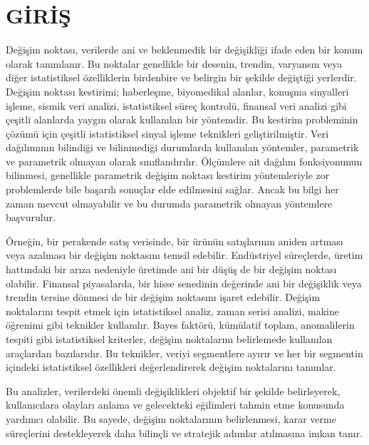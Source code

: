 \documentclass[12pt,twoside]{deuthesis}
\begin{document}
\mainmatter %
\pagestyle{fancyplain} %

\chapter*{GİRİŞ}\label{giriux15f}

Değişim noktası, verilerde ani ve beklenmedik bir değişikliği ifade eden bir konum olarak tanımlanır. Bu noktalar genellikle bir desenin, trendin, varyansın veya diğer istatistiksel özelliklerin birdenbire ve belirgin bir şekilde değiştiği yerlerdir. Değişim noktası kestirimi; haberleşme, biyomedikal alanlar, konuşma sinyalleri işleme, sismik veri analizi, istatistiksel süreç kontrolü, finansal veri analizi gibi çeşitli alanlarda yaygın olarak kullanılan bir yöntemdir. Bu kestirim probleminin çözümü için çeşitli istatistiksel sinyal işleme teknikleri geliştirilmiştir. Veri dağılımının bilindiği ve bilinmediği durumlarda kullanılan yöntemler, parametrik ve parametrik olmayan olarak sınıflandırılır. Ölçümlere ait dağılım fonksiyonunun bilinmesi, genellikle parametrik değişim noktası kestirim yöntemleriyle zor problemlerde bile başarılı sonuçlar elde edilmesini sağlar. Ancak bu bilgi her zaman mevcut olmayabilir ve bu durumda parametrik olmayan yöntemlere başvurulur.

Örneğin, bir perakende satış verisinde, bir ürünün satışlarının aniden artması veya azalması bir değişim noktasını temsil edebilir. Endüstriyel süreçlerde, üretim hattındaki bir arıza nedeniyle üretimde ani bir düşüş de bir değişim noktası olabilir. Finansal piyasalarda, bir hisse senedinin değerinde ani bir değişiklik veya trendin tersine dönmesi de bir değişim noktasını işaret edebilir. Değişim noktalarını tespit etmek için istatistiksel analiz, zaman serisi analizi, makine öğrenimi gibi teknikler kullanılır. Bayes faktörü, kümülatif toplam, anomalilerin tespiti gibi istatistiksel kriterler, değişim noktalarını belirlemede kullanılan araçlardan bazılarıdır. Bu teknikler, veriyi segmentlere ayırır ve her bir segmentin içindeki istatistiksel özellikleri değerlendirerek değişim noktalarını tanımlar.

Bu analizler, verilerdeki önemli değişiklikleri objektif bir şekilde belirleyerek, kullanıcılara olayları anlama ve gelecekteki eğilimleri tahmin etme konusunda yardımcı olabilir. Bu sayede, değişim noktalarının belirlenmesi, karar verme süreçlerini destekleyerek daha bilinçli ve stratejik adımlar atılmasına imkan tanır.
\end{document}

